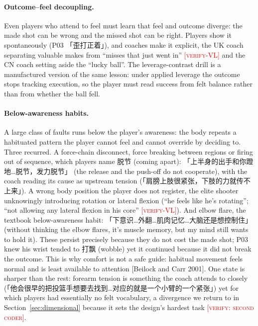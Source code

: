 \documentclass[sigconf]{acmart}
\newcommand{\vf}[1]{\textcolor{red}{[\textsc{#1}]}}
\begin{document}
\paragraph{Outcome--feel decoupling.} Even players who attend to feel must learn that feel and outcome diverge: the made shot can be wrong and the missed shot can be right. Players show it spontaneously (P03 「歪打正着」), and coaches make it explicit, the UK coach separating valuable makes from ``misses that just went in'' \vf{verify-VL} and the CN coach setting aside the ``lucky ball''. The leverage-contrast drill is a manufactured version of the same lesson: under applied leverage the outcome stops tracking execution, so the player must read success from felt balance rather than from whether the ball fell.

\paragraph{Below-awareness habits.} A large class of faults runs below the player's awareness: the body repeats a habituated pattern the player cannot feel and cannot override by deciding to. Three recurred. A force-chain disconnect, force breaking between regions or firing out of sequence, which players name 脱节 (coming apart): 「上半身的出手和你蹬地…脱节，发力脱节」 (the release and the push-off do not cooperate), with the coach reading its cause as upstream tension (「肩膀上肢很紧张，下肢的力就传不上来」). A wrong body position the player does not register, the elite shooter unknowingly introducing rotation or lateral flexion (``he feels like he's rotating''; ``not allowing any lateral flexion in his core'' \vf{verify-VL}). And elbow flare, the textbook below-awareness habit: 「下意识…外翻…肌肉记忆…大脑还是想控制住」 (without thinking the elbow flares, it's muscle memory, but my mind still wants to hold it). These persist precisely because they do not cost the made shot; P03 knew his wrist tended to 打飘 (wobble) yet it continued because it did not break the outcome. This is why comfort is not a safe guide: habitual movement feels normal and is least available to attention [Beilock and Carr 2001]. One state is sharper than the rest: forearm tension is something the coach attends to closely (「他会很早的把投篮手想要去找到…对应的就是一个小臂的一个紧张」) yet for which players had essentially no felt vocabulary, a divergence we return to in Section~\ref{sec:dimensional} because it sets the design's hardest task \vf{verify: second coder}.
\end{document}
